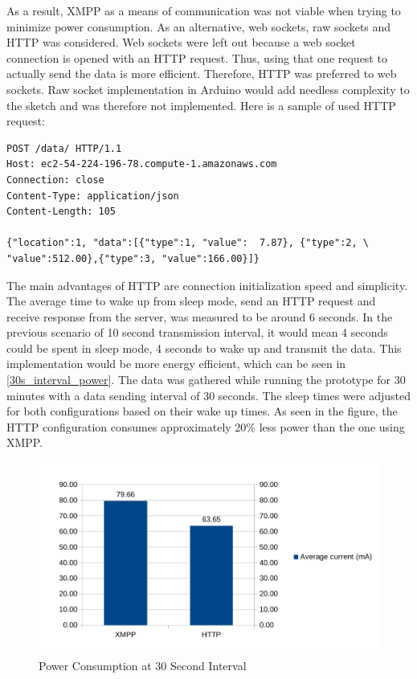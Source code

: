 As a result, XMPP as a means of communication was not viable when trying to minimize power consumption. As an alternative, web sockets, raw sockets and HTTP was considered. Web sockets were left out because a web socket connection is opened with an HTTP request. Thus, using that one request to actually send the data is more efficient. Therefore, HTTP was preferred to web sockets. Raw socket implementation in Arduino would add needless complexity to the sketch and was therefore not implemented. Here is a sample of used HTTP request:

\begin{lstlisting}
POST /data/ HTTP/1.1
Host: ec2-54-224-196-78.compute-1.amazonaws.com
Connection: close
Content-Type: application/json
Content-Length: 105

{"location":1, "data":[{"type":1, "value":  7.87}, {"type":2, \
"value":512.00},{"type":3, "value":166.00}]}
\end{lstlisting}

The main advantages of HTTP are connection initialization speed and simplicity. The average time to wake up from sleep mode, send an HTTP request and receive response from the server, was measured to be around 6 seconds. In the previous scenario of 10 second transmission interval, it would mean 4 seconds could be spent in sleep mode, 4 seconds to wake up and transmit the data. This implementation would be more energy efficient, which can be seen in \autoref{30s_interval_power}. The data was gathered while running the prototype for 30 minutes with a data sending interval of 30 seconds. The sleep times were adjusted for both configurations based on their wake up times. As seen in the figure, the HTTP configuration consumes approximately 20\% less power than the one using XMPP.

\begin{figure}[h]
\centering
\includegraphics[scale=0.9]{4/figures/30s_xmpp_vs_http.pdf}
\caption{Power Consumption at 30 Second Interval}
\label{30s_interval_power}
\end{figure}

